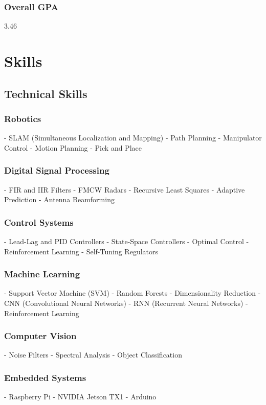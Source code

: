\documentclass[a4paper]{article}
\begin{document}
\subsubsection{Overall GPA}
3.46

\section{Skills}

\subsection{Technical Skills}
        
\subsubsection{Robotics}
- SLAM (Simultaneous Localization and Mapping)
- Path Planning
- Manipulator Control
- Motion Planning
- Pick and Place
    
\subsubsection{Digital Signal Processing}
- FIR and IIR Filters
- FMCW Radars
- Recursive Least Squares
- Adaptive Prediction
- Antenna Beamforming
    
\subsubsection{Control Systems}
- Lead-Lag and PID Controllers
- State-Space Controllers
- Optimal Control
- Reinforcement Learning
- Self-Tuning Regulators
    
\subsubsection{Machine Learning}
- Support Vector Machine (SVM)
- Random Forests
- Dimensionality Reduction
- CNN (Convolutional Neural Networks)
- RNN (Recurrent Neural Networks)
- Reinforcement Learning
    
\subsubsection{Computer Vision}
- Noise Filters
- Spectral Analysis
- Object Classification
    
\subsubsection{Embedded Systems}
- Raspberry Pi
- NVIDIA Jetson TX1
- Arduino
\end{document}

